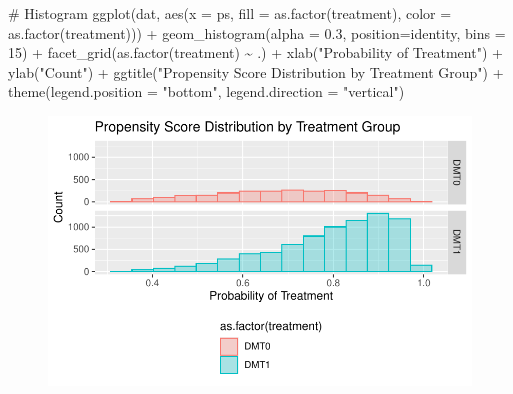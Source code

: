 \documentclass[
  letterpaper,
  DIV=11,
  numbers=noendperiod]{scrreprt}
\newenvironment{Shaded}{\begin{snugshade}}{\end{snugshade}}
\newcommand{\AttributeTok}[1]{\textcolor[rgb]{0.40,0.45,0.13}{#1}}
\newcommand{\CommentTok}[1]{\textcolor[rgb]{0.37,0.37,0.37}{#1}}
\newcommand{\DecValTok}[1]{\textcolor[rgb]{0.68,0.00,0.00}{#1}}
\newcommand{\FloatTok}[1]{\textcolor[rgb]{0.68,0.00,0.00}{#1}}
\newcommand{\FunctionTok}[1]{\textcolor[rgb]{0.28,0.35,0.67}{#1}}
\newcommand{\NormalTok}[1]{\textcolor[rgb]{0.00,0.23,0.31}{#1}}
\newcommand{\SpecialCharTok}[1]{\textcolor[rgb]{0.37,0.37,0.37}{#1}}
\newcommand{\StringTok}[1]{\textcolor[rgb]{0.13,0.47,0.30}{#1}}
\begin{document}
\begin{Shaded}
\begin{Highlighting}[]
\CommentTok{\# Histogram}
\FunctionTok{ggplot}\NormalTok{(dat, }\FunctionTok{aes}\NormalTok{(}\AttributeTok{x =}\NormalTok{ ps, }\AttributeTok{fill =} \FunctionTok{as.factor}\NormalTok{(treatment), }\AttributeTok{color =} \FunctionTok{as.factor}\NormalTok{(treatment))) }\SpecialCharTok{+} 
  \FunctionTok{geom\_histogram}\NormalTok{(}\AttributeTok{alpha =} \FloatTok{0.3}\NormalTok{, }\AttributeTok{position=}\StringTok{\textquotesingle{}identity\textquotesingle{}}\NormalTok{, }\AttributeTok{bins =} \DecValTok{15}\NormalTok{) }\SpecialCharTok{+} 
  \FunctionTok{facet\_grid}\NormalTok{(}\FunctionTok{as.factor}\NormalTok{(treatment) }\SpecialCharTok{\textasciitilde{}}\NormalTok{ .) }\SpecialCharTok{+} 
  \FunctionTok{xlab}\NormalTok{(}\StringTok{"Probability of Treatment"}\NormalTok{) }\SpecialCharTok{+} 
  \FunctionTok{ylab}\NormalTok{(}\StringTok{"Count"}\NormalTok{) }\SpecialCharTok{+}
  \FunctionTok{ggtitle}\NormalTok{(}\StringTok{"Propensity Score Distribution by Treatment Group"}\NormalTok{) }\SpecialCharTok{+}
  \FunctionTok{theme}\NormalTok{(}\AttributeTok{legend.position =} \StringTok{"bottom"}\NormalTok{, }\AttributeTok{legend.direction =} \StringTok{"vertical"}\NormalTok{)}
\end{Highlighting}
\end{Shaded}

\begin{figure}[H]

{\centering \includegraphics{chapter_06_files/figure-pdf/unnamed-chunk-9-1.pdf}

}

\end{figure}
\end{document}
